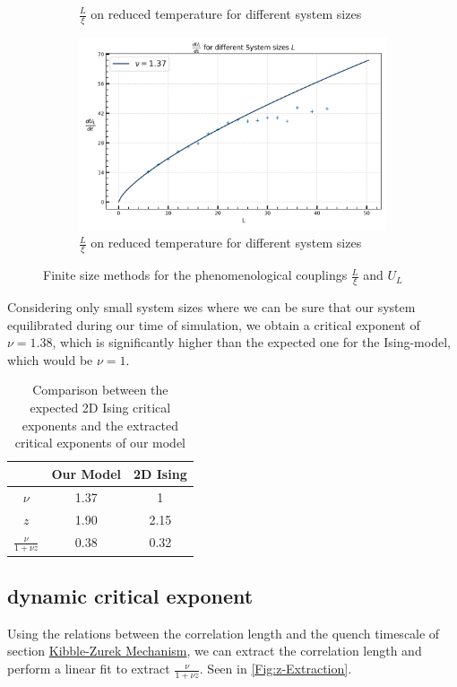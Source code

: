 \begin{figure}[ht]
\begin{subfigure}{0.5\textwidth}
			\caption{$\frac{L}{\xi}$ on reduced temperature for different system sizes}
		\end{subfigure}
		\begin{subfigure}{0.5\textwidth}
			\centering
			\includegraphics[width=0.8\linewidth]{graphics/critical exponent U_L.png}
			\caption{$\frac{L}{\xi}$ on reduced temperature for different system sizes}
		\end{subfigure}
		\caption{Finite size methods for the phenomenological couplings $\frac{L}{\xi}$ and $U_L$}
	\end{figure}
	Considering only small system sizes where we can be sure that our system equilibrated during our time of simulation, we obtain a critical exponent of $\nu = 1.38$, which is significantly higher than the expected one for the Ising-model, which would be $\nu  = 1$.
	
	\begin{table}
		\begin{center}
			\begin{tabular}{ccc}
				\centering
				& Our Model & 2D Ising \\  [0.5ex]
				\hline
				$\nu$ & 1.37 & 1 \\
				$z$ & 1.90 & 2.15 \\
				$\frac{\nu}{1 + \nu z}$ & 0.38 & 0.32
			\end{tabular}
			\caption{Comparison between the expected 2D Ising critical exponents and the extracted critical exponents of our model}
		\end{center}
	\end{table}
	
	\subsection{dynamic critical exponent}
	Using the relations between the correlation length and the quench timescale of section \hyperref[KZM]{Kibble-Zurek Mechanism}, we can extract the correlation length and perform a linear fit to extract $\frac{\nu}{1 + \nu z}$. Seen in \autoref{Fig:z-Extraction}.
	
